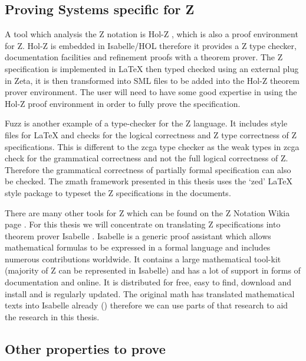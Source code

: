 \subsection{Proving Systems specific for Z}
\label{subsec:provingSystemsForZ}

A tool which analysis the Z notation is Hol-Z \cite{hol-z}, which is also a
proof environment for Z. Hol-Z is embedded in Isabelle/HOL therefore it provides
a Z type checker, documentation facilities and refinement proofs with a theorem
prover. The Z specification is implemented in \LaTeX{} then typed checked using
an external plug in Zeta, it is then transformed into SML files to be added into
the Hol-Z theorem prover environment. The user will need to have some good
expertise in using the Hol-Z proof environment in order to fully prove the
specification.

Fuzz \cite{spiveyfuzz} is another example of a type-checker for the Z language.
It includes style files for \LaTeX{} and checks for the logical correctness and
Z type correctness of Z specifications. This is different to the \gls{zcga} type
checker as the weak types in \gls{zcga} check for the grammatical correctness
and not the full logical correctness of Z. Therefore the grammatical correctness
of partially formal specification can also be checked. The \gls{zmath} framework
presented in this thesis uses the `zed' \LaTeX{} style package to typeset the Z
specifications in the documents.

There are many other tools for Z which can be found on the Z Notation Wikia page
\cite{zwikia}. For this thesis we will concentrate on translating Z
specifications into theorem prover Isabelle \cite{isabelle}. Isabelle is a
generic proof assistant which allows mathematical formulas to be expressed in a
formal language and includes numerous contributions worldwide. It contains a
large mathematical tool-kit (majority of Z can be represented in Isabelle) and
has a lot of support in forms of documentation and online. It is distributed for
free, easy to find, download and install and is regularly updated. The original
\gls{math} has translated mathematical texts into Isabelle already
(\cite{mathintoisa}) therefore we can use parts of that research to aid the
research in this thesis.

\subsection{Other properties to prove}
\label{subsec:propertiestoprove}

